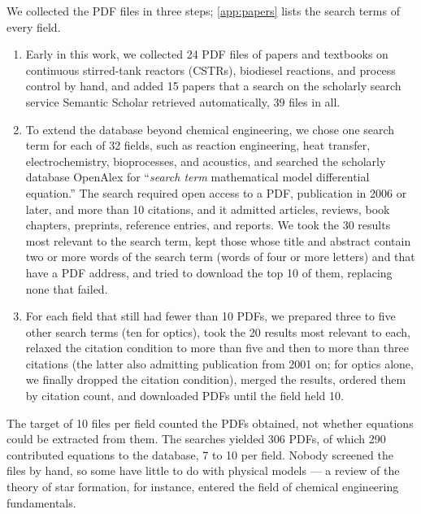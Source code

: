 We collected the PDF files in three steps; \ref{app:papers} lists the search terms of
every field.
\begin{enumerate}
  \item Early in this work, we collected 24 PDF files of papers and textbooks on continuous
    stirred-tank reactors (CSTRs), biodiesel reactions, and process control by hand, and added 15
    papers that a search on the scholarly search service Semantic Scholar retrieved automatically,
    39 files in all.
  \item To extend the database beyond chemical engineering, we chose one search term for each of
    32 fields, such as reaction engineering, heat transfer, electrochemistry, bioprocesses, and
    acoustics, and searched the scholarly database OpenAlex for ``\textit{search term}
    mathematical model differential equation.'' The search required open access to a PDF,
    publication in 2006 or later, and more than 10 citations, and it admitted articles, reviews,
    book chapters, preprints, reference entries, and reports. We took the 30 results most relevant
    to the search term, kept those whose title and abstract contain two or more words of the
    search term (words of four or more letters) and that have a PDF address, and tried to download
    the top 10 of them, replacing none that failed.
  \item For each field that still had fewer than 10 PDFs, we prepared three to five other search
    terms (ten for optics), took the 20 results most relevant to each, relaxed the citation
    condition to more than five and then to more than three citations (the latter also admitting
    publication from 2001 on; for optics alone, we finally dropped the citation condition),
    merged the results, ordered them by citation count, and downloaded PDFs until the field held
    10.
\end{enumerate}
The target of 10 files per field counted the PDFs obtained, not whether equations could be
extracted from them. The searches yielded 306 PDFs, of which 290 contributed equations to the
database, 7 to 10 per field. Nobody screened the files by hand, so some have little to do with
physical models --- a review of the theory of star formation, for instance, entered the field of
chemical engineering fundamentals.

